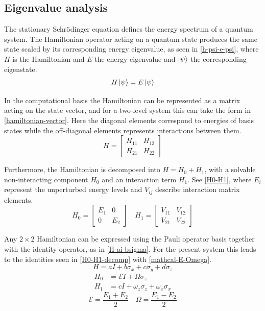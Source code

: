 \subsection{Eigenvalue analysis}

The stationary Schrödinger equation defines the energy spectrum of a quantum system. The Hamiltonian operator acting on a quantum state produces the same state scaled by its corresponding energy eigenvalue, as seen in \cref{h-psi-e-psi}, where $H$ is the Hamiltonian and $E$ the energy eigenvalue and $\left| \psi \right\rangle$ the corresponding eigenstate.
\begin{equation}\label{h-psi-e-psi}
    H\left| \psi \right\rangle=E\left| \psi \right\rangle
\end{equation}

In the computational basis the Hamiltonian can be represented as a matrix acting on the state vector, and for a two-level system this can take the form in \cref{hamiltonian-vector}. Here the diagonal elements correspond to energies of basis states while the off-diagonal elements represents interactions between them.
\begin{equation}\label{hamiltonian-vector}
    H=\begin{bmatrix}
        H_{11} & H_{12} \\
        H_{21} & H_{22}
    \end{bmatrix}
\end{equation}

Furthermore, the Hamiltonian is decomposed into $H=H_0+H_1$, with a solvable non-interacting component $H_0$ and an interaction term $H_1$. See \cref{H0-H1}, where $E_i$ represent the unperturbed energy levels and $V_{ij}$ describe interaction matrix elements.
\begin{equation}\label{H0-H1}
    H_0=\begin{bmatrix}
        E_1 & 0 \\
        0 & E_2
    \end{bmatrix}\quad
    H_1=\begin{bmatrix}
        V_{11} & V_{12} \\
        V_{21} & V_{22}
    \end{bmatrix}
\end{equation}

Any $2\times2$ Hamiltonian can be expressed using the Pauli operator basis together with the identity operator, as in \cref{H-ai-bsigma}. For the present system this leads to the identities seen in \cref{H0-H1-decomp} with \cref{mathcal-E-Omega}. 
\begin{equation}\label{H-ai-bsigma}
    H=aI+b\sigma_x+c\sigma_y+d\sigma_z
\end{equation}
\begin{equation}\label{H0-H1-decomp}
\begin{aligned}
    H_0 &= \mathcal{E}I + \Omega\sigma_z \\
    H_1 &= cI + \omega_z\sigma_z + \omega_x\sigma_x
\end{aligned}
\end{equation}
\begin{equation}\label{mathcal-E-Omega}
    \mathcal{E}=\frac{E_1+E_2}{2} \quad \Omega=\frac{E_1-E_2}{2}
\end{equation}

